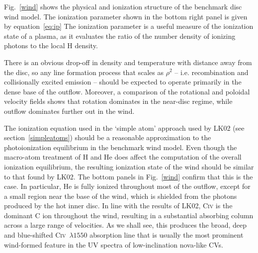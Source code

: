 Fig.~\ref{wind} shows the physical and ionization structure 
of the benchmark disc wind model. The ionization parameter shown in the bottom
right panel is given by equation~\ref{eq:ip}
 The ionization parameter is a useful measure of the ionization state of a plasma, 
as it evaluates the ratio of the number density of ionizing photons to the local 
H density.

There is an obvious drop-off in density
and temperature with distance away from the disc, so any line
formation process that scales as $\rho^2$ -- i.e. recombination and
collisionally excited emission -- should be expected to operate
primarily in the dense base of the outflow. Moreover, a comparison of
the rotational and poloidal velocity fields shows that rotation
dominates in the near-disc regime, while outflow dominates further out
in the wind. 

The ionization equation used in the `simple atom' approach used by
LK02 (see section~\ref{simpleatoms}) should be a reasonable approximation to
the photoionization equilibrium in the benchmark wind model. Even
though the macro-atom treatment of H and He does affect the 
computation of the overall ionization equilibrium, the
resulting ionization state of the wind should be similar to that
found by LK02. The bottom panels in Fig.~\ref{wind} confirm that this
is the case. In particular, He is fully ionized
throughout most of the outflow, except for a small region near the
base of the wind, which is shielded from the photons produced by the
hot inner disc. In line with the results of LK02,
C\textsc{iv} is the dominant C ion throughout the wind,
resulting in a substantial absorbing column across a large range of
velocities. As we shall see, this produces the broad, deep and
blue-shifted C\textsc{iv}~$\lambda1550$ absorption line that
is usually the most prominent wind-formed feature in the UV spectra of
low-inclination nova-like CVs.

